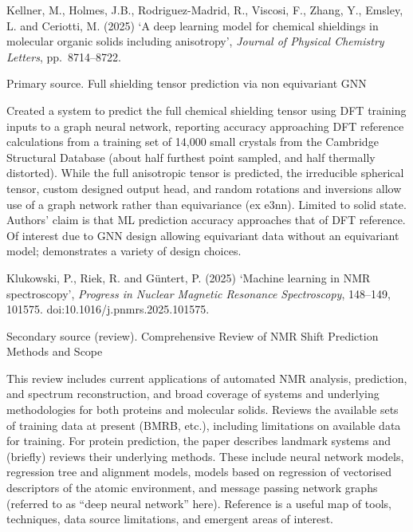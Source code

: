 \documentclass[11pt,a4paper]{article}
\begin{document}
\medskip

Kellner, M., Holmes, J.B., Rodriguez-Madrid, R., Viscosi, F., Zhang, Y., Emsley, L. and Ceriotti, M. (2025) `A deep learning model for chemical shieldings in molecular organic solids including anisotropy', \textit{Journal of Physical Chemistry Letters}, pp.~8714--8722.

Primary source. Full shielding tensor prediction via non equivariant GNN

Created a system to predict the full chemical shielding tensor using DFT training inputs to a graph neural network, reporting accuracy approaching DFT reference calculations from a training set of 14,000 small crystals from the Cambridge Structural Database (about half furthest point sampled, and half thermally distorted). While the full anisotropic tensor is predicted, the irreducible spherical tensor, custom designed output head, and random rotations and inversions allow use of a graph network rather than equivariance (ex e3nn). Limited to solid state. Authors' claim is that ML prediction accuracy approaches that of DFT reference. Of interest due to GNN design allowing equivariant data without an equivariant model; demonstrates a variety of design choices.

\medskip

Klukowski, P., Riek, R. and G\"untert, P. (2025) `Machine learning in NMR spectroscopy', \textit{Progress in Nuclear Magnetic Resonance Spectroscopy}, 148--149, 101575. doi:10.1016/j.pnmrs.2025.101575.

Secondary source (review). Comprehensive Review of NMR Shift Prediction Methods and Scope

This review includes current applications of automated NMR analysis, prediction, and spectrum reconstruction, and broad coverage of systems and underlying methodologies for both proteins and molecular solids. Reviews the available sets of training data at present (BMRB, etc.), including limitations on available data for training. For protein prediction, the paper describes landmark systems and (briefly) reviews their underlying methods. These include neural network models, regression tree and alignment models, models based on regression of vectorised descriptors of the atomic environment, and message passing network graphs (referred to as ``deep neural network'' here). Reference is a useful map of tools, techniques, data source limitations, and emergent areas of interest.
\end{document}
